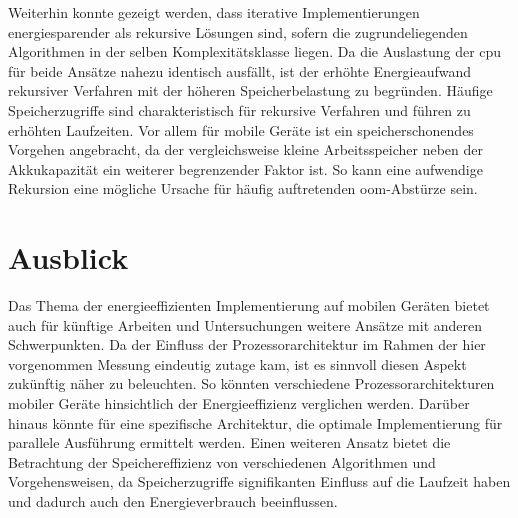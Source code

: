 Weiterhin konnte gezeigt werden, dass iterative Implementierungen energiesparender als rekursive Lösungen sind, sofern die zugrundeliegenden Algorithmen in der selben Komplexitätsklasse liegen. Da die Auslastung der \ac{cpu} für beide Ansätze nahezu identisch ausfällt, ist der erhöhte Energieaufwand rekursiver Verfahren mit der höheren Speicherbelastung zu begründen. Häufige Speicherzugriffe sind charakteristisch für rekursive Verfahren und führen zu erhöhten Laufzeiten. Vor allem für mobile Geräte ist ein speicherschonendes Vorgehen angebracht, da der vergleichsweise kleine Arbeitsspeicher neben  der Akkukapazität ein weiterer begrenzender Faktor ist. So kann eine aufwendige Rekursion eine mögliche Ursache für häufig auftretenden \ac{oom}-Abstürze sein.



\section{Ausblick}

Das Thema der energieeffizienten Implementierung auf mobilen Geräten bietet auch für künftige Arbeiten und Untersuchungen weitere Ansätze mit anderen Schwerpunkten. Da der Einfluss der Prozessorarchitektur im Rahmen der hier vorgenommen Messung eindeutig zutage kam, ist es sinnvoll diesen Aspekt zukünftig näher zu beleuchten. So könnten verschiedene Prozessorarchitekturen mobiler Geräte hinsichtlich der Energieeffizienz verglichen werden. Darüber hinaus könnte für eine spezifische Architektur, die optimale Implementierung für parallele Ausführung ermittelt werden. Einen weiteren Ansatz bietet die Betrachtung der Speichereffizienz von verschiedenen Algorithmen und Vorgehensweisen, da Speicherzugriffe signifikanten Einfluss auf die Laufzeit haben und dadurch auch den Energieverbrauch beeinflussen.
